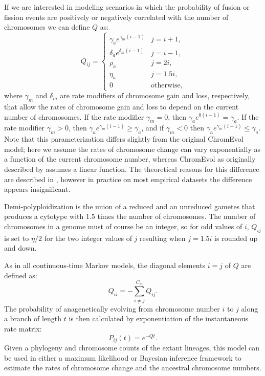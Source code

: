 If we are interested in modeling scenarios in which
the probability of fusion or fission events
are positively or negatively correlated with the number of chromosomes
we can define $Q$ as:
\begin{equation} \label{eq:anagenetic2}
Q_{ij} = 
    \begin{cases}
        \gamma_a e^{\gamma_m (i - 1)}  & j = i + 1,    \\
        \delta_a e^{\delta_m (i - 1)}     & j = i - 1,    \\
        \rho_a                                & j = 2i,       \\
        \eta_a                                 & j = 1.5i,     \\
        0                                   & \mbox{otherwise},   
    \end{cases}
\end{equation}
where $\gamma_m$ and $\delta_m$ are rate modifiers
of chromosome gain and loss, respectively,
that allow the rates of chromosome gain and loss to depend
on the current number of chromosomes.
If the rate modifier $\gamma_m = 0$, then
$\gamma_a e^{0 (i - 1)} = \gamma_a$.
If the rate modifier $\gamma_m > 0$, then
$\gamma_a e^{\gamma_m (i - 1)} \geq \gamma_a$,
and if $\gamma_m < 0$ then
$\gamma_a e^{\gamma_m (i - 1)} \leq \gamma_a$.
Note that this parameterization differs slightly from the original
ChromEvol model; here we assume the rates of chromosome change
can vary exponentially as a function of the current chromosome number,
whereas ChromEvol as originally described by \citet{mayrose2010probabilistic} assumes
a linear function.
The theoretical reasons for this difference are described in \citet{freyman2016cladogenetic},
however in practice on most empirical datasets the difference appears insignificant.


Demi-polyploidization is the union of
a reduced and an unreduced gametes that produces a cytotype 
with 1.5 times the number of chromosomes.
The number of chromosomes in a genome must of course be an integer, 
so for odd values of $i$, $Q_{ij}$ is set to $\eta/2$
for the two integer values of $j$ resulting when $j = 1.5i$ is rounded up and down.


As in all continuous-time Markov models,
the diagonal elements $i = j$ of $Q$ are defined as:
\begin{equation}
    Q_{ii} = - \sum_{i \neq j}^{C_m} Q_{ij}.
\end{equation}
The probability
of anagenetically evolving from chromosome number $i$ to $j$ along a branch
of length $t$ is then calculated by
exponentiation of the instantaneous rate matrix:
\begin{equation} \label{eq:anagenetic_probs}
    P_{ij}(t) = e^{-Qt}.
\end{equation}
Given a phylogeny and chromosome counts of the extant lineages,
this model can be used in either a maximum likelihood or Bayesian inference
framework to estimate the rates of chromosome change and the ancestral
chromosome numbers.


